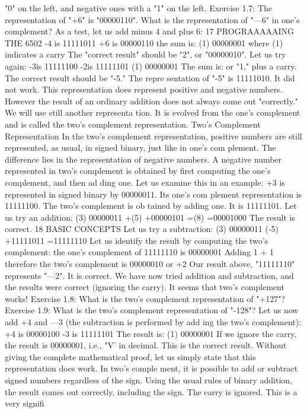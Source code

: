 \documentclass{book}
\begin{document}
"0" on the left, and negative ones with a "1" on the left.
Exercise 1.7: The representation of "+6" is "00000110". What is
the representation of "—6" in one's complement?
As a test, let us add minus 4 and plus 6:
17
PROGRAAAAAING THE 6502
-4 is 11111011
+6 is 00000110
the sum is: (1) 00000001 where (1) indicates a
carry
The "correct result" should be "2", or "00000010".
Let us try again:
-3is 11111100
-2is 11111101
(1) 00000001
The sum is:
or "1," plus a carry. The correct result should be "-5." The repre
sentation of "-5" is 11111010. It did not work.
This representation does represent positive and negative
numbers. However the result of an ordinary addition does not
always come out "correctly." We will use still another representa
tion. It is evolved from the one's complement and is called the
two's complement representation.
Two's Complement Representation
In the two's complement representation, positive numbers are
still represented, as usual, in signed binary, just like in one's com
plement. The difference lies in the representation of negative
numbers. A negative number represented in two's complement is
obtained by first computing the one's complement, and then ad
ding one. Let us examine this in an example:
+3 is represented in signed binary by 00000011. Its one's com
plement representation is 11111100. The two's complement is ob
tained by adding one. It is 11111101.
Let us try an addition:
(3) 00000011
+(5) +00000101
=(8) =00001000
The result is correct.
18
BASIC CONCEPTS
Let us try a subtraction:
(3) 00000011
(-5) +11111011
=11111110
Let us identify the result by computing the two's complement:
the one's complement of 11111110 is 00000001
Adding 1 + 1
therefore the two's complement is 00000010 or +2
Our result above, "11111110" represents "—2". It is correct.
We have now tried addition and subtraction, and the results were correct
(ignoring the carry). It seems that two's complement works!
Exercise 1.8: What is the two's complement representation of "+127"?
Exercise 1.9: What is the two's complement representation of "-128"?
Let us now add +4 and —3 (the subtraction is performed by add
ing the two's complement):
+4 is 00000100
-3 is 11111101
The result is: (1) 00000001
If we ignore the carry, the result is 00000001, i.e., "V' in decimal. This
is the correct result. Without giving the complete mathematical proof,
let us simply state that this representation does work. In two's comple
ment, it is possible to add or subtract signed numbers regardless of the
sign. Using the usual rules of binary addition, the result comes out
correctly, including the sign. The carry is ignored. This is a very signifi
\end{document}
